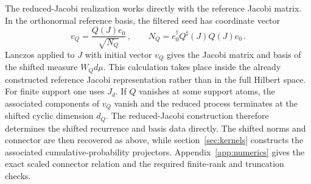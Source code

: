 \documentclass[a4paper,11pt]{article}
\def\dd{d}%
\def\Jac{J}%
\theoremstyle{definition}
\theoremstyle{remark}
\newcommand{\dd}{\mathrm d}
\newcommand{\Jac}{\mathsf J}
\newcommand{\Qsh}{Q^{\sharp}}
\begin{document}
The reduced-Jacobi realization works directly with the reference Jacobi matrix. In the orthonormal reference basis, the filtered seed has coordinate vector
\begin{equation}
   v_Q
   =
   \frac{Q(\Jac)e_0}{\sqrt{N_Q}}\,,
   \qquad
   N_Q
   =
  e_0^\dagger\Qsh(\Jac)Q(\Jac)e_0\,.
   \label{eq:reduced-jacobi-seed-main}
\end{equation}
Lanczos applied to $\Jac$ with initial vector $v_Q$ gives the Jacobi matrix and basis of the shifted measure $W_Q\dd\mu$. This calculation takes place inside the already constructed reference Jacobi representation rather than in the full Hilbert space. For finite support one uses $\Jac_d$. If $Q$ vanishes at some support atoms, the associated components of $v_Q$ vanish and the reduced process terminates at the shifted cyclic dimension $d_Q$. The reduced-Jacobi construction therefore determines the shifted recurrence and basis data directly. The shifted norms and connector are then recovered as above, while section~\ref{sec:kernels} constructs the associated cumulative-probability projectors. Appendix~\ref{app:numerics} gives the exact scaled connector relation and the required finite-rank and truncation checks.
\end{document}
